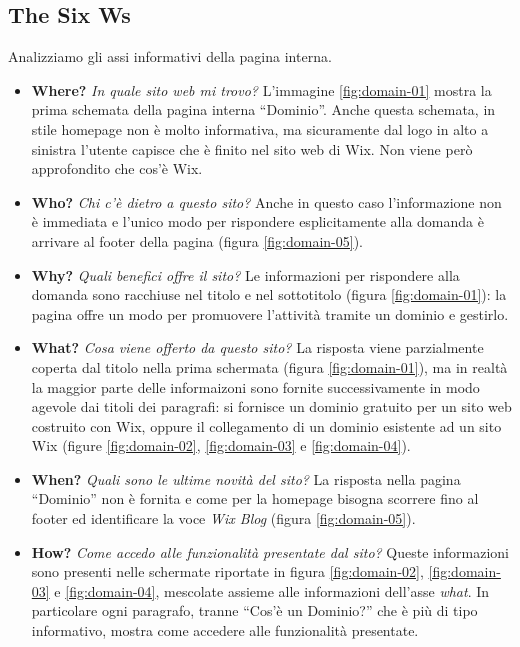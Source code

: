 \documentclass[11pt,a4paper]{article}
\newcommand*{\wix}{Wix}
\begin{document}
\subsection{The Six Ws}
\label{subsec:internalpage-the-six-ws}

Analizziamo gli assi informativi della pagina interna.

\begin{itemize}
  \item \textbf{Where?} \textit{In quale sito web mi trovo?}
    L'immagine \ref{fig:domain-01} mostra la prima schemata della
    pagina interna ``Dominio''. Anche questa schemata, in stile
    homepage non è molto informativa, ma sicuramente dal logo in alto
    a sinistra l'utente capisce che è finito nel sito web di
    \wix{}. Non viene però approfondito che cos'è \wix{}.

  \item \textbf{Who?} \textit{Chi c'è dietro a questo sito?} Anche in
    questo caso l'informazione non è immediata e l'unico modo per
    rispondere esplicitamente alla domanda è arrivare al footer della
    pagina (figura \ref{fig:domain-05}).

  \item \textbf{Why?} \textit{Quali benefici offre il sito?} Le
    informazioni per rispondere alla domanda sono racchiuse nel titolo
    e nel sottotitolo (figura \ref{fig:domain-01}): la pagina offre un
    modo per promuovere l'attività tramite un dominio e gestirlo.

  \item \textbf{What?} \textit{Cosa viene offerto da questo sito?} La
    risposta viene parzialmente coperta dal titolo nella prima
    schermata (figura \ref{fig:domain-01}), ma in realtà la maggior
    parte delle informaizoni sono fornite successivamente in modo
    agevole dai titoli dei paragrafi: si fornisce un dominio gratuito
    per un sito web costruito con \wix{}, oppure il collegamento di un
    dominio esistente ad un sito \wix{} (figure \ref{fig:domain-02},
    \ref{fig:domain-03} e \ref{fig:domain-04}).

  \item \textbf{When?} \textit{Quali sono le ultime novità del sito?}
    La risposta nella pagina ``Dominio'' non è fornita e come per la
    homepage bisogna scorrere fino al footer ed identificare la voce
    \textit{Wix Blog} (figura \ref{fig:domain-05}).

  \item \textbf{How?} \textit{Come accedo alle funzionalità presentate
    dal sito?} Queste informazioni sono presenti nelle schermate
    riportate in figura \ref{fig:domain-02}, \ref{fig:domain-03} e
    \ref{fig:domain-04}, mescolate assieme alle informazioni dell'asse
    \textit{what}. In particolare ogni paragrafo, tranne ``Cos'è un
    Dominio?'' che è più di tipo informativo, mostra come accedere
    alle funzionalità presentate.
\end{itemize}
\end{document}
